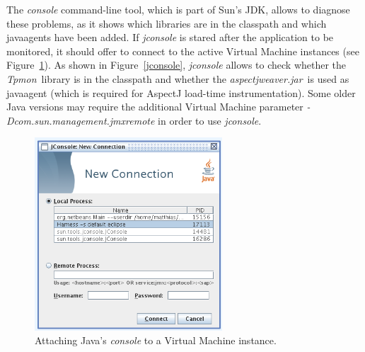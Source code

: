 \documentclass[a4paper,12pt]{scrartcl}
\newcommand{\tpmon}{\textit{Tpmon}}
\newcommand{\aspectjweaverjar}{\textit{aspectjweaver.jar}}
\begin{document}
The \textit{console} command-line tool, which is part of Sun's JDK, allows to diagnose these problems, as it shows which libraries are in the classpath and which javaagents have been added. If \textit{jconsole} is stared after the application to be monitored, it should offer to connect to the active Virtual Machine instances (see Figure~\ref{jconsolestartup}). As shown in Figure~\ref{jconsole}, \textit{jconsole} allows to check whether the \tpmon\ library is in the classpath and whether the \aspectjweaverjar\ is used as javaagent (which is required for AspectJ load-time instrumentation). Some older Java versions may require the additional Virtual Machine parameter \textit{-Dcom.sun.management.jmxremote} in order to use \textit{jconsole}.

\begin{figure}
 \centering
 \includegraphics[width=7cm]{snapshot4b.png}
\caption{Attaching Java's \textit{console} to a Virtual Machine instance.}
 \label{jconsolestartup}
\end{figure}
\end{document}
